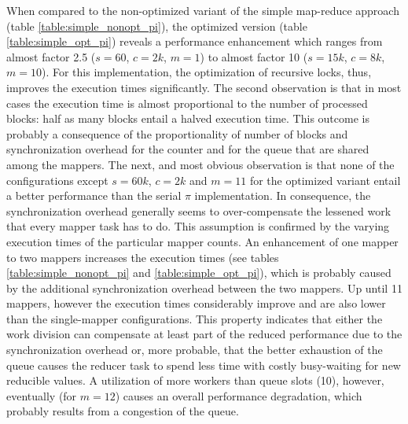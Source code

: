 When compared to the non-optimized variant of the simple map-reduce approach (table \ref{table:simple_nonopt_pi}), the optimized version (table \ref{table:simple_opt_pi}) reveals a performance enhancement which ranges from almost factor 2.5 ($s = 60$, $c = 2k$, $m = 1$) to almost factor 10 ($s = 15k$, $c = 8k$, $m = 10$). For this implementation, the optimization of recursive locks, thus, improves the execution times significantly. The second observation is that in most cases the execution time is almost proportional to the number of processed blocks: half as many blocks entail a halved execution time. This outcome is probably a consequence of the proportionality of number of blocks and synchronization overhead for the counter and for the queue that are shared among the mappers. The next, and most obvious observation is that none of the configurations except $s = 60k$, $c = 2k$ and $m = 11$ for the optimized variant entail a better performance than the serial $\pi$ implementation. In consequence, the synchronization overhead generally seems to over-compensate the lessened work that every mapper task has to do. This assumption is confirmed by the varying execution times of the particular mapper counts. An enhancement of one mapper to two mappers increases the execution times (see tables \ref{table:simple_nonopt_pi} and \ref{table:simple_opt_pi}), which is probably caused by the additional synchronization overhead between the two mappers. Up until 11 mappers, however the execution times considerably improve and are also lower than the single-mapper configurations. This property indicates that either the work division can compensate at least part of the reduced performance due to the synchronization overhead or, more probable, that the better exhaustion of the queue causes the reducer task to spend less time with costly busy-waiting for new reducible values. A utilization of more workers than queue slots (10), however, eventually (for $m = 12$) causes an overall performance degradation, which probably results from a congestion of the queue.

